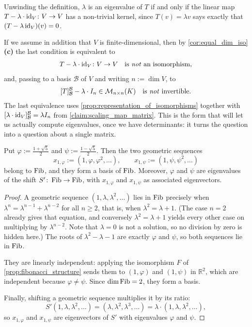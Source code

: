 \begin{remark}
\label{rem:eigenvalue_reformulations}
Unwinding the definition, $\lambda$ is an eigenvalue of $T$ if and only if the linear map $T - \lambda \cdot \operatorname{id}_V \colon V \to V$ has a non-trivial kernel, since $T(v) = \lambda v$ says exactly that $(T - \lambda \operatorname{id}_V)(v) = 0$.

If we assume in addition that $V$ is finite-di\-men\-sional, then by \cref{cor:equal_dim_iso} \textbf{(c)} the last condition is equivalent to
\[
T - \lambda \cdot \operatorname{id}_V \colon V \to V \quad \text{is \emph{not} an isomorphism,}
\]
and, passing to a basis $\mathcal{B}$ of $V$ and writing $n := \dim V$, to
\[
[T]_{\mathcal{B}}^{\mathcal{B}} - \lambda \cdot I_n \in \mathcal{M}_{n \times n}(K) \quad \text{is \emph{not} invertible.}
\]
The last equivalence uses \cref{prop:representation_of_isomorphisms} together with $[\lambda \cdot \operatorname{id}_V]_{\mathcal{B}}^{\mathcal{B}} = \lambda I_n$ from \cref{claim:scaling_map_matrix}. This is the form that will let us actually compute eigenvalues, once we have determinants: it turns the question into a question about a single matrix.
\end{remark}

\begin{proposition}
\label{prop:fibonacci_eigenvalues}
Put $\varphi := \frac{1 + \sqrt{5}}{2}$ and $\psi := \frac{1 - \sqrt{5}}{2}$. Then the two geometric sequences
\[
x_{1, \varphi} := (1, \varphi, \varphi^2, \dots), \qquad x_{1, \psi} := (1, \psi, \psi^2, \dots)
\]
belong to $\operatorname{Fib}$, and they form a basis of $\operatorname{Fib}$. Moreover, $\varphi$ and $\psi$ are eigenvalues of the shift $S' \colon \operatorname{Fib} \to \operatorname{Fib}$, with $x_{1,\varphi}$ and $x_{1,\psi}$ as associated eigenvectors.
\end{proposition}

\begin{proof}
A geometric sequence $(1, \lambda, \lambda^2, \dots)$ lies in $\operatorname{Fib}$ precisely when $\lambda^n = \lambda^{n-1} + \lambda^{n-2}$ for all $n \ge 2$, that is, when $\lambda^2 = \lambda + 1$. (The case $n = 2$ already gives that equation, and conversely $\lambda^2 = \lambda + 1$ yields every other case on multiplying by $\lambda^{n-2}$. Note that $\lambda = 0$ is not a solution, so no division by zero is hidden here.) The roots of $\lambda^2 - \lambda - 1$ are exactly $\varphi$ and $\psi$, so both sequences lie in $\operatorname{Fib}$.

They are linearly independent: applying the isomorphism $F$ of \cref{prop:fibonacci_structure} sends them to $(1, \varphi)$ and $(1, \psi)$ in $\mathbb{R}^2$, which are independent because $\varphi \neq \psi$. Since $\dim \operatorname{Fib} = 2$, they form a basis.

Finally, shifting a geometric sequence multiplies it by its ratio:
\[
S'(1, \lambda, \lambda^2, \dots) = (\lambda, \lambda^2, \lambda^3, \dots) = \lambda \cdot (1, \lambda, \lambda^2, \dots),
\]
so $x_{1,\varphi}$ and $x_{1,\psi}$ are eigenvectors of $S'$ with eigenvalues $\varphi$ and $\psi$.
\end{proof}

